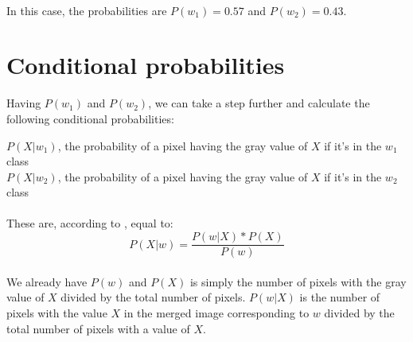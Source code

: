 \paragraph{}
In this case, the probabilities are $P(w_1) = 0.57$ and $P(w_2) = 0.43$.

\clearpage

\section{Conditional probabilities}
Having $P(w_1)$ and $P(w_2)$, we can take a step further and calculate the following conditional probabilities:
\begin{center}
    $P(X|w_1)$, the probability of a pixel having the gray value of $X$ if it's in the $w_1$ class
    \\
    $P(X|w_2)$, the probability of a pixel having the gray value of $X$ if it's in the $w_2$ class
\end{center}

\paragraph{}
These are, according to \cite{bayes_theorem}, equal to:
$$P(X|w) = \frac{P(w | X) * P(X)}{P(w)}$$

\paragraph{}
We already have $P(w)$ and $P(X)$ is simply the number of pixels with the gray value of $X$ divided by the total number of pixels.
$P(w | X)$ is the number of pixels with the value $X$ in the merged image corresponding to $w$ divided by the total number of pixels with a value of $X$.

